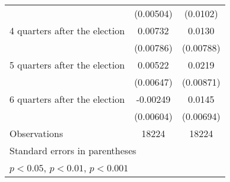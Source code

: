 \begin{table}[htbp]
\begin{tabular}{l*{2}{c}}
                    &   (0.00504)         &    (0.0102)         \\
[1em]
 4 quarters after the election&     0.00732         &      0.0130         \\
                    &   (0.00786)         &   (0.00788)         \\
[1em]
 5 quarters after the election&     0.00522         &      0.0219\sym{*}  \\
                    &   (0.00647)         &   (0.00871)         \\
[1em]
 6 quarters after the election&    -0.00249         &      0.0145\sym{*}  \\
                    &   (0.00604)         &   (0.00694)         \\
\hline
Observations        &       18224         &       18224         \\
\hline\hline
\multicolumn{3}{l}{\footnotesize Standard errors in parentheses}\\
\multicolumn{3}{l}{\footnotesize \sym{*} \(p<0.05\), \sym{**} \(p<0.01\), \sym{***} \(p<0.001\)}\\
\end{tabular}
\end{table}
